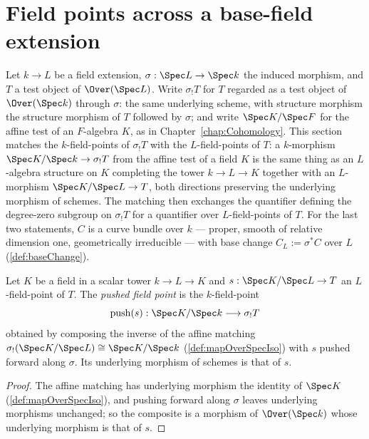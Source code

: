 \section{Field points across a base-field extension}
\label{sec:fieldPointMatching}

Let \(k \to L\) be a field extension, \(\sigma : \Spec L \to \Spec k\) the induced
morphism, and \(T\) a test object of \(\Over(\Spec L)\). Write \(\sigma_{!}T\) for
\(T\) regarded as a test object of \(\Over(\Spec k)\) through \(\sigma\): the same
underlying scheme, with structure morphism the structure morphism of \(T\) followed by
\(\sigma\); and write \(\Spec K/\Spec F\) for the affine test of an \(F\)-algebra
\(K\), as in Chapter~\ref{chap:Cohomology}. This section matches the
\(k\)-field-points of \(\sigma_{!}T\) with the \(L\)-field-points of \(T\): a
\(k\)-morphism \(\Spec K/\Spec k \to \sigma_{!}T\) from the affine test of a field
\(K\) is the same thing as an \(L\)-algebra structure on \(K\) completing the tower
\(k \to L \to K\) together with an \(L\)-morphism \(\Spec K/\Spec L \to T\), both
directions preserving the underlying morphism of schemes. The matching then exchanges
the quantifier defining the degree-zero subgroup on \(\sigma_{!}T\) for a quantifier
over \(L\)-field-points of \(T\). For the last two statements, \(C\) is a curve bundle
over \(k\) --- proper, smooth of relative dimension one, geometrically irreducible ---
with base change \(C_L := \sigma^{*}C\) over \(L\) (\ref{def:baseChange}).

\begin{definition}
  \label{def:pushFieldPoint}
  \leanok
  Let \(K\) be a field in a scalar tower \(k \to L \to K\) and
  \(s : \Spec K/\Spec L \to T\) an \(L\)-field-point of \(T\). The \emph{pushed field
  point} is the \(k\)-field-point
  \[
    \mathrm{push}(s) : \Spec K/\Spec k \longrightarrow \sigma_{!}T
  \]
  obtained by composing the inverse of the affine matching
  \(\sigma_{!}(\Spec K/\Spec L) \cong \Spec K/\Spec k\) (\ref{def:mapOverSpecIso}) with
  \(s\) pushed forward along \(\sigma\). Its underlying morphism of schemes is that of
  \(s\).
\end{definition}
\begin{proof}
  \leanok
  The affine matching has underlying morphism the identity of \(\Spec K\)
  (\ref{def:mapOverSpecIso}), and pushing forward along \(\sigma\) leaves underlying
  morphisms unchanged; so the composite is a morphism of \(\Over(\Spec k)\) whose
  underlying morphism is that of \(s\).
\end{proof}

